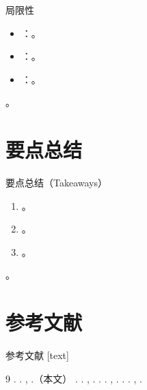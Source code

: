 \begin{frame}{局限性}
  \begin{itemize}
    \item {}：。
    \item {}：。
    \item {}：。
  \end{itemize}
  \begin{callout}[作者展望]
    。
  \end{callout}
\end{frame}

\renewcommand{\secblurb}{\ph{本节一句话主旨：全文最值得带走的结论}}
\section{要点总结}

\begin{frame}{要点总结（Takeaways）}
  \begin{enumerate}
    \item {}。
    \item {}。
    \item {}。
  \end{enumerate}
  \begin{callout}[一句话带走]
    。
  \end{callout}
\end{frame}

\renewcommand{\secblurb}{\ph{本节一句话主旨：关键参考与根基工作}}
\section{参考文献}

\begin{frame}{参考文献}
  [text]
  \footnotesize
  \begin{thebibliography}{9}
     . \textit{}. , .（本文）
     . \textit{}. , .
     . \textit{}. , .
     . \textit{}. , .
  \end{thebibliography}
\end{frame}


